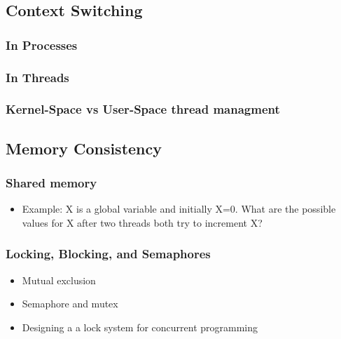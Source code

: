 \documentclass[11pt]{article}
\begin{document}
\subsection{Context Switching}
\label{sec-6.3}

\subsubsection{In Processes}
\label{sec-6.3.1}

\subsubsection{In Threads}
\label{sec-6.3.2}

\subsubsection{Kernel-Space vs User-Space thread managment}
\label{sec-6.3.3}

\subsection{Memory Consistency}
\label{sec-6.4}

\subsubsection{Shared memory}
\label{sec-6.4.1}

\begin{itemize}

\item Example: X is a global variable and initially X=0. What are the possible values for X after two threads both try to increment X?\\
\label{sec-6.4.1.1}

\end{itemize} %
\subsubsection{Locking, Blocking, and Semaphores}
\label{sec-6.4.2}

\begin{itemize}

\item Mutual exclusion\\
\label{sec-6.4.2.1}


\item Semaphore and mutex\\
\label{sec-6.4.2.2}


\item Designing a a lock system for concurrent programming\\
\label{sec-6.4.2.3}

\end{itemize} %
\end{document}
